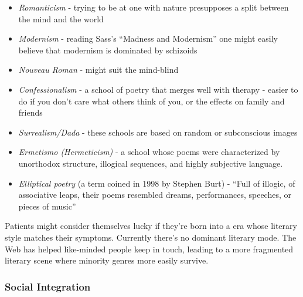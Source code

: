 \documentclass[11pt]{article}
\begin{document}
\begin{itemize}
    \item  \textit{Romanticism} - trying to be at one with nature presupposes a split between the mind and the world
         \item  \textit{Modernism} - reading Sass's ``Madness and Modernism'' one might easily believe that modernism is dominated by schizoids
        \item \textit{Nouveau Roman} - might suit the mind-blind
         \item  \textit{Confessionalism} - a school of poetry that merges well with therapy - easier to do if you don't care what others think of you, or the effects on family and friends
         \item  \textit{Surrealism/Dada} - these schools are based on random or subconscious images
         \item  \textit{Ermetismo (Hermeticism)}  - a school whose poems were characterized by unorthodox structure, illogical sequences, and highly subjective language.
   \item  \textit{Elliptical poetry} (a term coined in 1998 by Stephen Burt) - ``Full of illogic, of associative leaps, their poems resembled dreams, performances, speeches, or pieces of music''
\end{itemize}


Patients might consider themselves lucky if they're born into a era whose literary style matches
their symptoms. Currently there's no dominant literary mode. The Web has helped like-minded people
keep in touch, leading to a more fragmented literary scene where minority genres more easily survive.

\subsubsection*{Social Integration}
\end{document}
